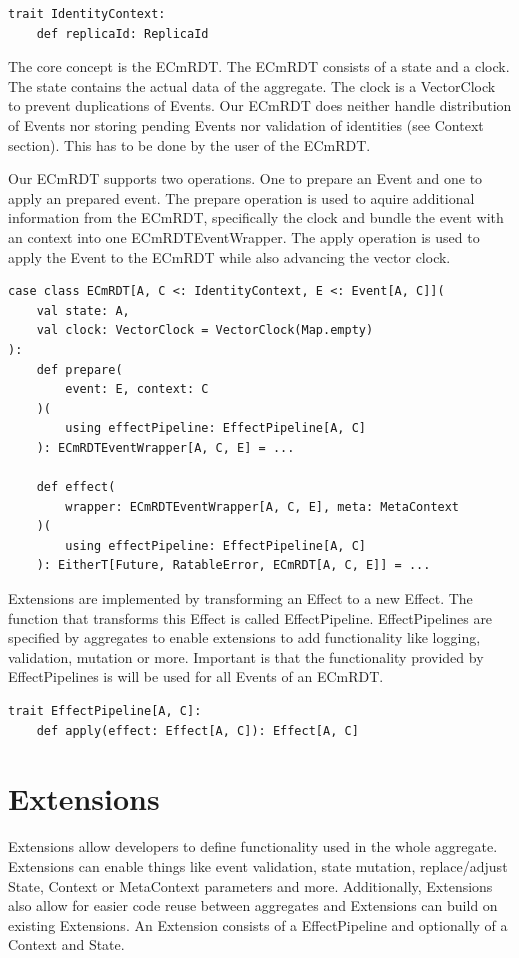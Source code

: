 \documentclass[
	ngerman,
	ruledheaders=section,   %
	class=report,		    %
	thesis={type=bachelor}, %
	accentcolor=9c,			%
	custommargins=true,    %
	marginpar=false,        %
	parskip=half-,          %
	fontsize=11pt,          %
]{tudapub}
\begin{document}
\begin{lstlisting}
trait IdentityContext:
	def replicaId: ReplicaId
\end{lstlisting}

The core concept is the ECmRDT. The ECmRDT consists of a state and a clock. The state contains the actual data of the aggregate. The clock is a VectorClock to prevent duplications of Events. Our ECmRDT does neither handle distribution of Events nor storing pending Events nor validation of identities (see Context section). This has to be done by the user of the ECmRDT.

Our ECmRDT supports two operations. One to prepare an Event and one to apply an prepared event. The prepare operation is used to aquire additional information from the ECmRDT, specifically the clock and bundle the event with an context into one ECmRDTEventWrapper. The apply operation is used to apply the Event to the ECmRDT while also advancing the vector clock.

\begin{lstlisting}
case class ECmRDT[A, C <: IdentityContext, E <: Event[A, C]](
	val state: A,
	val clock: VectorClock = VectorClock(Map.empty)
):
	def prepare(
		event: E, context: C
	)(
		using effectPipeline: EffectPipeline[A, C]
	): ECmRDTEventWrapper[A, C, E] = ...

	def effect(
		wrapper: ECmRDTEventWrapper[A, C, E], meta: MetaContext
	)(
		using effectPipeline: EffectPipeline[A, C]
	): EitherT[Future, RatableError, ECmRDT[A, C, E]] = ...
\end{lstlisting}

Extensions are implemented by transforming an Effect to a new Effect. The function that transforms this Effect is called EffectPipeline. EffectPipelines are specified by aggregates to enable extensions to add functionality like logging, validation, mutation or more. Important is that the functionality provided by EffectPipelines is will be used for all Events of an ECmRDT. 

\begin{lstlisting}
trait EffectPipeline[A, C]:
	def apply(effect: Effect[A, C]): Effect[A, C]
\end{lstlisting}

\section{Extensions}
Extensions allow developers to define functionality used in the whole aggregate. Extensions can enable things like event validation, state mutation, replace/adjust State, Context or MetaContext parameters and more. Additionally, Extensions also allow for easier code reuse between aggregates and Extensions can build on existing Extensions. An Extension consists of a EffectPipeline and optionally of a Context and State. 
\end{document}
